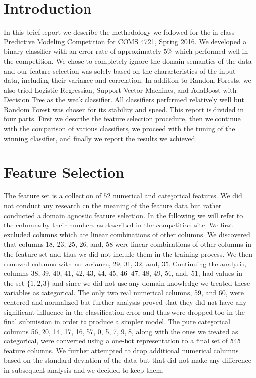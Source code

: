 \documentclass[twoside,11pt]{homework}
\begin{document}
\maketitle

\section*{Introduction}

In this brief report we describe the methodology we followed for the in-class Predictive Modeling Competition for COMS 4721, Spring 2016. We developed a binary classifier with an error rate of approximately $5\%$ which performed well in the competition. We chose to completely ignore the domain semantics of the data and our feature selection was solely based on the
characteristics of the input data, including their variance and correlation. In addition to Random Forests, we also tried Logistic Regression, Support Vector Machines, and AdaBoost with Decision Tree as the weak classifier. All classifiers performed relatively well but Random Forest was chosen for its stability and speed. This report is divided in four parts. First we describe the feature selection procedure, then we continue with the comparison of various classifiers, we proceed with the tuning of the winning classifier, and finally we report the results we achieved. 


\section*{Feature Selection}


The feature set is a collection of $52$ numerical and categorical features. We did not conduct any research on the meaning of the feature data but rather conducted a domain agnostic feature selection. In the following we will refer to the columns by their numbers as described in the competition site. We first excluded columns which are linear combinations of other columns. We discovered that columns 18, 23, 25, 26, and, 58 were linear combinations of other columns in the feature set and thus we did not include them in the training process. We then removed columns with no variance, 29, 31, 32, and, 35. Continuing the analysis, columns 38, 39, 40, 41, 42, 43, 44, 45, 46, 47, 48, 49, 50, and, 51, had values in the set $\{1,2,3\}$ and since we did not use any domain knowledge we treated these variables as categorical. The only two real numerical columns, 59, and 60,  were centered and normalized but further analysis proved that they did not have any significant influence in the classification error and thus were dropped too in the final submission in order to produce a simpler model. The pure categorical columns 56, 20, 14, 17, 16, 57, 0, 5, 7, 9, 8, along with the ones we treated as categorical, were converted using a one-hot representation to a final set of 545 feature columns. We further attempted to drop additional numerical columns based on the standard deviation of the data but that did not make any difference in subsequent analysis and we decided to keep them.
\end{document}
